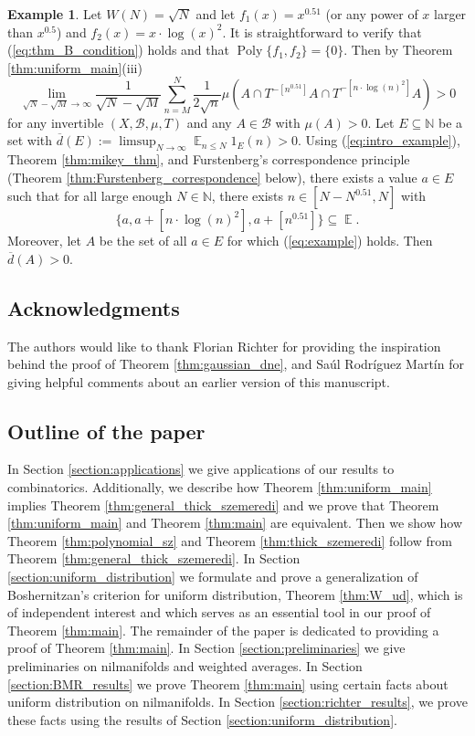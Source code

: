 \documentclass[12pt]{article}
\theoremstyle{plain} %
\theoremstyle{definition} %
\newtheorem{example}[theorem]{Example}
\theoremstyle{plain}
\theoremstyle{plain}
\numberwithin{equation}{section}
\newcommand{\N}{\mathbb{N}}
\renewcommand{\leq}{\leqslant}
\renewcommand{\subset}{\subseteq}
\newcommand{\1}{\mathbbm{1}}
\newcommand{\E}{\operatorname{\mathbb{E}}}
\newcommand{\Poly}{\operatorname{Poly}}
\newcommand{\oo}{\infty}
\newcommand{\round}[1]{[ #1 ]}
\begin{document}
\begin{example}
    Let $W(N)={\sqrt{N}}$ and let $f_1(x) = x^{0.51}$ (or any power of $x$ larger than $x^{0.5}$) and $f_2(x)= x\cdot \log(x)^2$. It is straightforward to verify that (\ref{eq:thm_B_condition}) holds and that $\Poly\{f_1,f_2\}=\{0\}$. Then by Theorem \ref{thm:uniform_main}(iii)
    \begin{equation}\label{eq:intro_example}
    \lim_{\sqrt{N}-\sqrt{M}\to\oo}\frac{1}{\sqrt{N}-\sqrt{M}}\sum_{n=M}^N\frac{1}{2\sqrt{n}}\mu(A\cap T^{-\round{n^{0.51}}}A\cap  T^{-\round{n\cdot \log(n)^2}}A) >0
    \end{equation}
    for any invertible $(X,\mathscr{B},\mu,T)$ and any $A\in \mathscr{B}$ with $\mu(A)>0$. Let $E\subset \N$ be a set with $\overline{d}(E):=\limsup_{N\to\oo}\E_{n\leq N}1_E(n) > 0$. Using (\ref{eq:intro_example}), Theorem \ref{thm:mikey_thm}, and Furstenberg's correspondence principle (Theorem \ref{thm:Furstenberg_correspondence} below), there exists a value $a\in E$ such that for all large enough $N\in \N$, there exists $n\in [N-N^{0.51},N]$ with 
    \begin{equation}\label{eq:example}
   \{a,a+\round{n\cdot \log(n)^2},a+\round{n^{0.51}}\}\subseteq \E.
   \end{equation}
  Moreover, let $A$ be the set of all $a\in E$ for which (\ref{eq:example}) holds. Then $\overline{d}(A)>0$.
    \end{example}

\subsection{Acknowledgments}
The authors would like to thank Florian Richter for providing the inspiration behind the proof of Theorem \ref{thm:gaussian_dne}, and Sa\'ul Rodr\'iguez Mart\'in for giving helpful comments about an earlier version of this manuscript. 

\subsection{Outline of the paper}
In Section \ref{section:applications} we give applications of our results to combinatorics. Additionally, we describe how Theorem \ref{thm:uniform_main} implies Theorem \ref{thm:general_thick_szemeredi} and we prove that Theorem \ref{thm:uniform_main} and Theorem \ref{thm:main} are equivalent. Then we show how Theorem \ref{thm:polynomial_sz} and Theorem \ref{thm:thick_szemeredi} follow from Theorem \ref{thm:general_thick_szemeredi}. In Section \ref{section:uniform_distribution} we formulate and prove a generalization of Boshernitzan's criterion for uniform distribution, Theorem \ref{thm:W_ud}, which is of independent interest and which serves as an essential tool in our proof of Theorem \ref{thm:main}.
The remainder of the paper is dedicated to providing a proof of Theorem \ref{thm:main}. In Section \ref{section:preliminaries} we give preliminaries on nilmanifolds and weighted averages. In Section \ref{section:BMR_results} we prove Theorem \ref{thm:main} using certain facts about uniform distribution on nilmanifolds. In Section \ref{section:richter_results}, we prove these facts using the results of Section \ref{section:uniform_distribution}.
\end{document}
